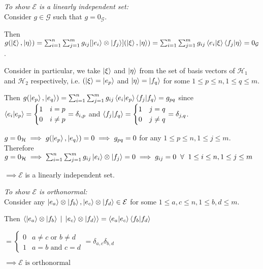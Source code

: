 \documentclass[12pt,twoside,fleqn]{report}
\makeatletter
\theoremstyle{thmstyle}
\renewenvironment{proof}[1][\proofname]{\par
\pushQED{\qed}%
\normalfont \topsep6\p@\@plus6\p@\relax
\trivlist
\item[\hskip\labelsep\itshape#1\@addpunct{.}]\mbox{}\par\nobreak\ignorespaces
}{%
    \popQED\endtrivlist\@endpefalse
    }
\makeatother
\begin{document}
\begin{proof}
     \emph{To show $\mathcal{E}$ is a linearly independent set:} \\

     Consider $g \in \mathcal{G}$ such that $g = 0_\mathcal{G}$.

     Then $g(\ket\xi, \ket\eta) = \sum_{i=1}^n \sum_{j=1}^m g_{ij} [\ket{e_i} \otimes \ket{f_j}](\ket\xi, \ket\eta) = \sum_{i=1}^n \sum_{j=1}^m g_{ij} \braket{e_i|\xi} \braket{f_j|\eta} = 0_\mathcal{G}$.

     Consider in particular, we take $\ket\xi$ and $\ket\eta$ from the set of basis vectors of $\mathcal{H}_1$ and $\mathcal{H}_2$ respectively, i.e. $(\ket\xi = \ket{e_p}$ and $\ket\eta = \ket{f_q}$ for some $1 \leq p \leq n, 1 \leq q \leq m$.

     Then $g(\ket{e_p}, \ket{e_q}) = \sum_{i=1}^n \sum_{j=1}^m g_{ij} \braket{e_i|e_p} \braket{f_j|f_q} = g_{pq}$ since $\braket{e_i|e_p} = \begin{cases} 1 & i = p \\ 0 & i \neq p \end{cases} = \delta_{i,p}$
     and $\braket{f_j|f_q} = \begin{cases} 1 & j = q \\ 0 & j \neq q \end{cases} = \delta_{j,q}$.

         $g = 0_\mathcal{H} \implies g(\ket{e_p}, \ket{e_q}) = 0 \implies g_{pq} = 0$ for any $1 \leq p \leq n, 1 \leq j \leq m$.
         Therefore $g = 0_\mathcal{H} \implies  \sum_{i=1}^n \sum_{j=1}^m g_{ij} \ket{e_i} \otimes \ket{f_j} = 0 \implies g_{ij} = 0 \;\; \forall \;\; 1 \leq i \leq n, 1 \leq j \leq m$

         $\implies \mathcal{E}$ is a linearly independent set.

         \emph{To show $\mathcal{E}$ is orthonormal:} \\
         Consider any $\ket{e_a} \otimes \ket{f_b}, \ket{e_c} \otimes \ket{f_d} \in \mathcal{E}$ for some $1 \leq a,c \leq n, 1 \leq b,d \leq m$.

         Then $\braket{\ket{e_a} \otimes \ket{f_b} \; | \; \ket{e_c} \otimes \ket{f_d}} = \braket{e_a|e_c} \braket{f_b|f_d} $

         $ = \begin{cases} 0 & a \neq c \text{ or } b \neq d \\ 1 & a = b \text{ and } c = d \end{cases} = \delta_{a,c} \delta_{b,d}$

             $\implies \mathcal{E} \text{ is orthonormal}$
\end{proof}
\end{document}

